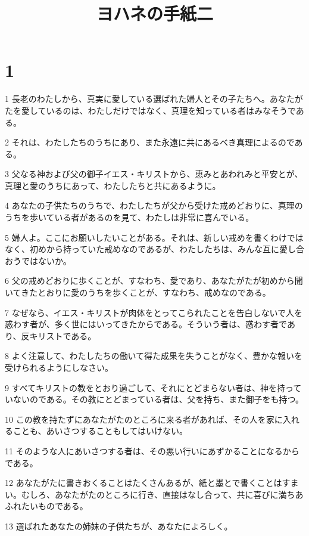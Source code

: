 

\title{ヨハネの手紙二}


\chapter{1}

\par 1 長老のわたしから、真実に愛している選ばれた婦人とその子たちへ。あなたがたを愛しているのは、わたしだけではなく、真理を知っている者はみなそうである。
\par 2 それは、わたしたちのうちにあり、また永遠に共にあるべき真理によるのである。
\par 3 父なる神および父の御子イエス・キリストから、恵みとあわれみと平安とが、真理と愛のうちにあって、わたしたちと共にあるように。
\par 4 あなたの子供たちのうちで、わたしたちが父から受けた戒めどおりに、真理のうちを歩いている者があるのを見て、わたしは非常に喜んでいる。
\par 5 婦人よ。ここにお願いしたいことがある。それは、新しい戒めを書くわけではなく、初めから持っていた戒めなのであるが、わたしたちは、みんな互に愛し合おうではないか。
\par 6 父の戒めどおりに歩くことが、すなわち、愛であり、あなたがたが初めから聞いてきたとおりに愛のうちを歩くことが、すなわち、戒めなのである。
\par 7 なぜなら、イエス・キリストが肉体をとってこられたことを告白しないで人を惑わす者が、多く世にはいってきたからである。そういう者は、惑わす者であり、反キリストである。
\par 8 よく注意して、わたしたちの働いて得た成果を失うことがなく、豊かな報いを受けられるようにしなさい。
\par 9 すべてキリストの教をとおり過ごして、それにとどまらない者は、神を持っていないのである。その教にとどまっている者は、父を持ち、また御子をも持つ。
\par 10 この教を持たずにあなたがたのところに来る者があれば、その人を家に入れることも、あいさつすることもしてはいけない。
\par 11 そのような人にあいさつする者は、その悪い行いにあずかることになるからである。
\par 12 あなたがたに書きおくることはたくさんあるが、紙と墨とで書くことはすまい。むしろ、あなたがたのところに行き、直接はなし合って、共に喜びに満ちあふれたいものである。
\par 13 選ばれたあなたの姉妹の子供たちが、あなたによろしく。


